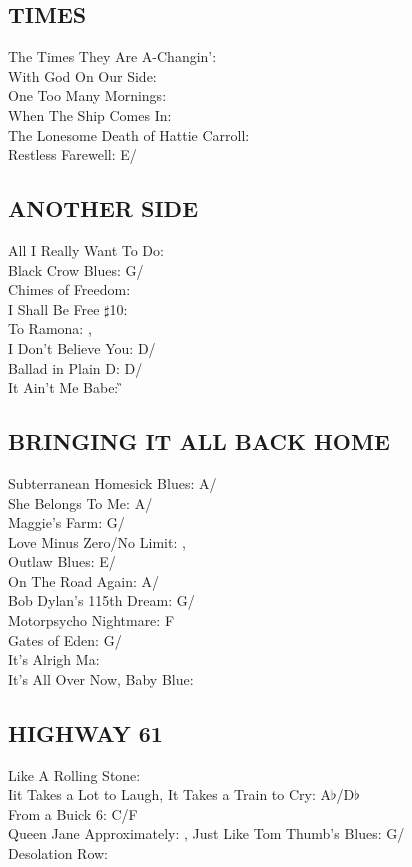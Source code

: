 \subsection{TIMES}
The Times They Are A-Changin': \G\\
With God On Our Side: \C\\
One Too Many Mornings: \C\\
When The Ship Comes In: \G\\
The Lonesome Death of Hattie Carroll: \E\\
Restless Farewell: E/\A


 \subsection{ANOTHER SIDE}
All I Really Want To Do: \A\\ Black Crow Blues: G/\C\\ Chimes of Freedom: \G\\ I Shall Be Free $\sharp$10: \G\\ To Ramona: \C,\\
 I Don't Believe You: D/\G\\ Ballad in Plain D: D/\G\\ It Ain't Me Babe: \G


\subsection{BRINGING IT ALL BACK HOME}
Subterranean Homesick Blues: A/\D\\ She Belongs To Me: A/\D\\ Maggie's Farm: G/\C\\ Love Minus Zero/No Limit: \E,\\
 Outlaw Blues: E/\A\\ On The Road Again: A/\D\\ Bob Dylan's 115th Dream: G/\C\\ Motorpsycho Nightmare: F\\ Gates of Eden: G/\C\\ It's Alrigh Ma: \E\\ It's All Over Now, Baby Blue: \E


\subsection{HIGHWAY 61}
Like A Rolling Stone: \C\\ Iit Takes a Lot to Laugh, It Takes a Train to Cry: A$\flat$/D$\flat$\\
From a Buick 6: C/F\\ Queen Jane Approximately: \C,
Just Like Tom Thumb's Blues: G/\C\\ Desolation Row: \E


